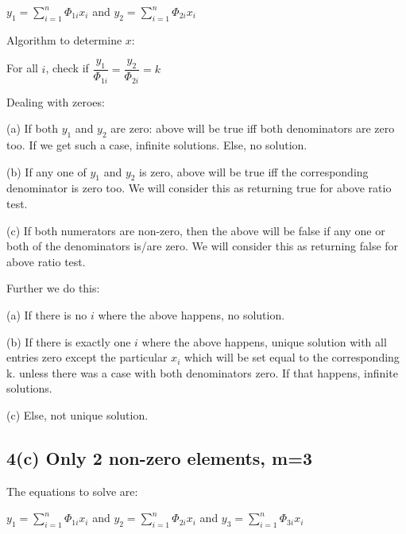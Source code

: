 \documentclass[fleqn, 11pt]{article}
\begin{document}
$y_1=\displaystyle \sum_{i=1}^{n} \Phi_{1i} x_i$ \hspace{10pt} and 
 \hspace{10pt} $y_2=\displaystyle \sum_{i=1}^{n} \Phi_{2i} x_i$ 
 
\smallskip

Algorithm to determine $x$: 

\smallskip

For all $i$, check if 
$\dfrac{y_1}{\Phi_{1i}}=\dfrac{y_2}{\Phi_{2i}}=k$

\medskip

Dealing with zeroes: 

\smallskip

(a) If both $y_1$ and $y_2$ are zero: above will be true iff both 
denominators are zero too. If we get such a case, infinite solutions. 
Else, no solution. 

(b) If any one of $y_1$ and $y_2$ is zero, above will be true iff the 
corresponding denominator is zero too. We will consider this as returning true for above ratio test.

(c) If both numerators are non-zero, then the above will be false if 
any one or both of the denominators is/are zero.
We will consider this as returning false for above ratio test.


\medskip

Further we do this:

\smallskip

(a) If there is no $i$ where the above happens, no solution.

(b) If there is exactly one $i$ where the above happens, unique solution with 
all entries zero except the particular $x_i$ which will be set equal to the
corresponding k.
unless
there was a case with both denominators zero. If that happens, 
infinite solutions.

(c) Else, not unique solution.



\subsection*{4(c) Only 2 non-zero elements, m=3}

The equations to solve are: 

\smallskip
 
 $y_1=\displaystyle \sum_{i=1}^{n} \Phi_{1i} x_i$ \hspace{10pt} and 
 \hspace{10pt} $y_2=\displaystyle \sum_{i=1}^{n} \Phi_{2i} x_i$ 
 \hspace{10pt} and 
 \hspace{10pt} $y_3=\displaystyle \sum_{i=1}^{n} \Phi_{3i} x_i$ 
 
\end{document}
